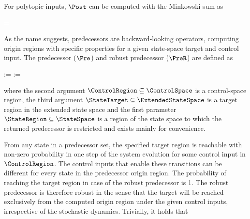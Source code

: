     For polytopic inputs, $\Post$ can be computed with the Minkowski sum as

    \startformula
         = \MatA \StateRegion \oplus \MatB \ControlRegion \oplus \RandomSpace \EndPeriod
    \stopformula

\stopsection


\startsubsection[title={Predecessors}]

    As the name suggests, predecessors are backward-looking operators, computing origin regions with specific properties for a given state-space target and control input.
    The predecessor ($\Pre$) and robust predecessor ($\PreR$) are defined as

    \startformula
        \startalign[n=2,align={right,left}]
            \NC {} :=
            \NC {} \EndAnd
            \NR
            \NC {} :=
            \NC {} \EndComma
            \NR
        \stopalign
    \stopformula

    where the second argument $\ControlRegion \subseteq \ControlSpace$ is a control-space region, the third argument $\StateTarget \subseteq \ExtendedStateSpace$ is a target region in the extended state space and the first parameter $\StateRegion \subseteq \StateSpace$ is a region of the state space to which the returned predecessor is restricted and exists mainly for convenience.

    From any state in a predecessor set, the specified target region is reachable with non-zero probability in one step of the system evolution for some control input in $\ControlRegion$.
    The control inputs that enable these transitions can be different for every state in the predecessor origin region.
    The probability of reaching the target region in case of the robust predecessor is 1.
    The robust predecessor is therefore robust in the sense that the target will be reached exclusively from the computed origin region under the given control inputs, irrespective of the stochastic dynamics.
    Trivially, it holds that

    \startformula
         \subseteq {} \EndPeriod
    \stopformula

